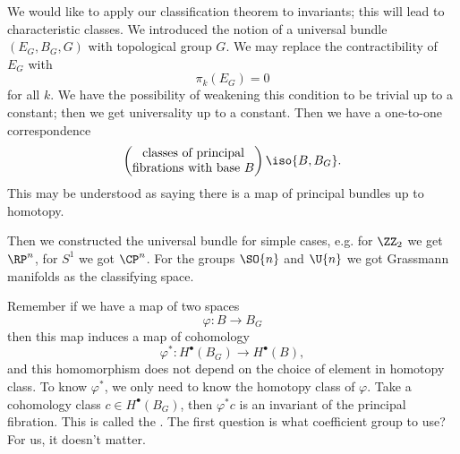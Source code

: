 We would like to apply our classification theorem to invariants;
this will lead to characteristic classes. We introduced the
notion of a universal bundle $(E_{G},B_{G},G)$ with topological
group $G$. We may replace the contractibility of $E_{G}$ with 
\begin{equation}
\pi_{k}(E_{G})=0
\end{equation}
for all $k$. We have the possibility of weakening this condition
to be trivial up to a constant; then we get universality up to a
constant. Then we have a one-to-one correspondence
\begin{equation}
\begin{pmatrix}
\text{classes of principal}\\
\text{fibrations with base $B$}
\end{pmatrix}
\iso\homotopyClass(B,B_{G}).
\end{equation}
This may be understood as saying there is a map of principal
bundles up to homotopy.

Then we constructed the universal bundle for simple cases,
e.g. for $\ZZ_{2}$ we get $\RP^{n}$, for $S^{1}$ we got
$\CP^{n}$. For the groups $\SO{n}$ and $\U{n}$ we got Grassmann
manifolds as the classifying space.

Remember if we have a map of two spaces
\begin{equation}
\varphi\colon B\to B_{G}
\end{equation}
then this map induces a map of cohomology
\begin{equation}
\varphi^{*}\colon H^{\bullet}(B_{G})\to H^{\bullet}(B),
\end{equation}
and this homomorphism does not depend on the choice of element in
homotopy class. To know $\varphi^{*}$, we only need to know the
homotopy class of $\varphi$. Take a cohomology class $c\in
H^{\bullet}(B_{G})$, then $\varphi^{*}c$ is an invariant of the
principal fibration. This is called the . The first question is what
coefficient group to use? For us, it doesn't matter.

